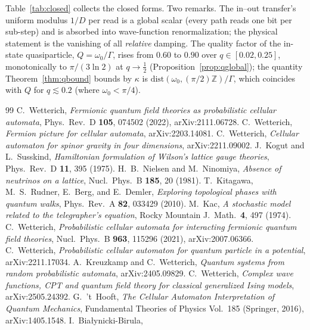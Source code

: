\documentclass[aps,prd,twocolumn,superscriptaddress,nofootinbib,floatfix]{revtex4-2}
\begin{document}
Table~\ref{tab:closed} collects the closed forms. Two remarks. The
in--out transfer's uniform modulus $1/D$ per read is a global scalar
(every path reads one bit per sub-step) and is absorbed into wave-function
renormalization; the physical statement is the vanishing of all
\emph{relative} damping. The quality factor of the in-state quasiparticle,
$Q=\omega_0/\Gamma$, rises from $0.60$ to $0.90$ over
$q\in[0.02,0.25]$, monotonically to $\pi/(3\ln2)$ at $q\to\tfrac12$
(Proposition~\ref{prop:qglobal}); the quantity
Theorem~\ref{thm:qbound} bounds by
$\kappa$ is $\mathrm{dist}(\omega_0,(\pi/2)\mathbb Z)/\Gamma$, which
coincides with $Q$ for $q\lesssim0.2$ (where $\omega_0<\pi/4$).

\begin{thebibliography}{99}
 C.~Wetterich,
\emph{Fermionic quantum field theories as probabilistic cellular automata},
Phys.\ Rev.\ D \textbf{105}, 074502 (2022), arXiv:2111.06728.
 C.~Wetterich,
\emph{Fermion picture for cellular automata}, arXiv:2203.14081.
 C.~Wetterich,
\emph{Cellular automaton for spinor gravity in four dimensions},
arXiv:2211.09002.
 J.~Kogut and L.~Susskind,
\emph{Hamiltonian formulation of Wilson's lattice gauge theories},
Phys.\ Rev.\ D \textbf{11}, 395 (1975).
 H.~B.~Nielsen and M.~Ninomiya,
\emph{Absence of neutrinos on a lattice}, Nucl.\ Phys.\ B \textbf{185}, 20
(1981).
 T.~Kitagawa, M.~S.~Rudner, E.~Berg, and E.~Demler,
\emph{Exploring topological phases with quantum walks},
Phys.\ Rev.\ A \textbf{82}, 033429 (2010).
 M.~Kac,
\emph{A stochastic model related to the telegrapher's equation},
Rocky Mountain J.\ Math.\ \textbf{4}, 497 (1974).
 C.~Wetterich,
\emph{Probabilistic cellular automata for interacting fermionic quantum
field theories}, Nucl.\ Phys.\ B \textbf{963}, 115296 (2021),
arXiv:2007.06366.
 C.~Wetterich,
\emph{Probabilistic cellular automaton for quantum particle in a
potential}, arXiv:2211.17034.
 A.~Kreuzkamp and C.~Wetterich,
\emph{Quantum systems from random probabilistic automata},
arXiv:2405.09829.
 C.~Wetterich,
\emph{Complex wave functions, CPT and quantum field theory for classical
generalized Ising models}, arXiv:2505.24392.
 G.~'t~Hooft,
\emph{The Cellular Automaton Interpretation of Quantum Mechanics},
Fundamental Theories of Physics Vol.~185 (Springer, 2016),
arXiv:1405.1548.
 I.~Bia{\l}ynicki-Birula,

\end{thebibliography}
\end{document}
